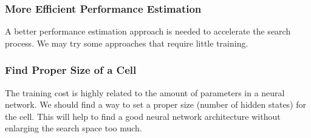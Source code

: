 \documentclass[conference]{IEEEtran}
\begin{document}
  \subsubsection{More Efficient Performance Estimation}
  A better performance estimation approach is needed to accelerate the search process. We may try some approaches that require little training.
  
  \subsubsection{Find Proper Size of a Cell}
  The training cost is highly related to the amount of parameters in a neural network. We should find a way to set a proper size (number of hidden states) for the cell. This will help to find a good neural network architecture without enlarging the search space too much.
   



\end{document}
